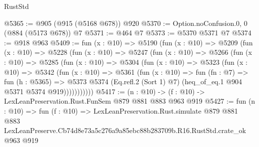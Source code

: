 \begin{lexlean}{RustStd}
\begin{coremodule}
@5365 := @905 (@915 (@5168 @678)) @920
@5370 := Option.noConfusion.{0, 0} (@884 (@5173 @678)) @7
@5371 := @464 @7
@5373 := @5370 @5371 @7
@5374 := @918 @963
@5409 := fun (x : @10) =>
  @5190
    (fun (x : @10) =>
    @5209
      (fun (x : @10) =>
      @5228
        (fun (x : @10) =>
        @5247
          (fun (x : @10) =>
          @5266
            (fun (x : @10) =>
            @5285
              (fun (x : @10) =>
              @5304
                (fun (x : @10) =>
                @5323
                  (fun (x : @10) =>
                  @5342
                    (fun (x : @10) =>
                    @5361
                      (fun (x : @10) =>
                      fun (fn : @7) =>
                      fun (h : @5365) =>
                      @5373
                        @5374
                        (Eq.refl.{2} (Sort 1) @7)
                        (heq_of_eq.{1} @904 @5371 @5374 @919)))))))))))
@5417 := (n : @10) -> (f : @10) -> LexLeanPreservation.Rust.FunSem @879 @881 @883 @963 @919
@5427 := fun (n : @10) =>
  fun (f : @10) =>
  LexLeanPreservation.Rust.simulate
    @879
    @881
    @883
    LexLeanPreserve.Cb74d8e73a5c276a9a85ebc88b283709b.R16.RustStd.crate_ok
    @963
    @919
\end{coremodule}
\end{lexlean}
